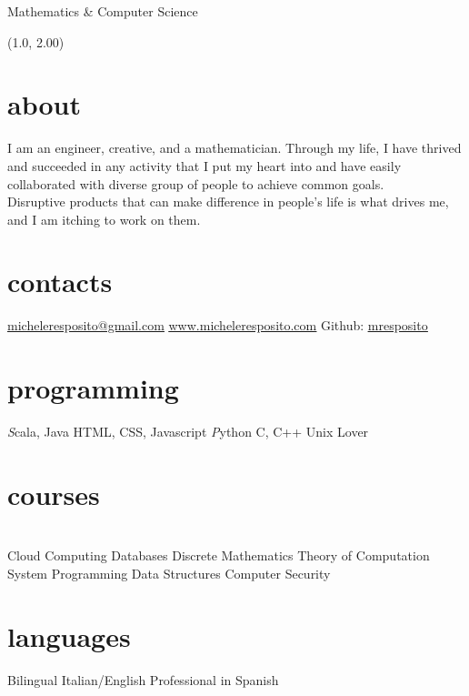 \documentclass[]{mre-cv}
\begin{document}
       {Mathematics \& Computer Science}
\begin{textblock}{18.6}(1.0, 2.00)
\section{about} %
I am an engineer, creative, and a mathematician. Through my life, I have thrived and succeeded in any activity that I put my heart into and have easily collaborated with diverse group of people to achieve common goals.\\
Disruptive products that can make difference in people's life is what drives me, and I am itching to work on them.\\
\end{textblock}
\begin{aside}
  \section{contacts}
    \href{mailto:micheleresposito@gmail.com}{\underline{micheleresposito@gmail.com}}
    \href{http://www.micheleresposito.com}{\underline{www.micheleresposito.com}}
    Github: \href{https://github.com/mresposito}{\underline{mresposito}}
    \vspace{.25cm}
    \vspace{1.24cm}
  \section{programming}
    {\emph Scala, Java}
    HTML, CSS, Javascript
    {\emph Python }
    C, C++
    Unix Lover
    \vspace{0.62cm}
  \section{courses}\\ %
    Cloud Computing
    Databases
    Discrete Mathematics
    Theory of Computation
    System Programming
    Data Structures
    Computer Security
  \vspace{3.24cm}

  \section{languages}
    Bilingual Italian/English
    Professional in Spanish 

 
\end{aside}
\end{document}
